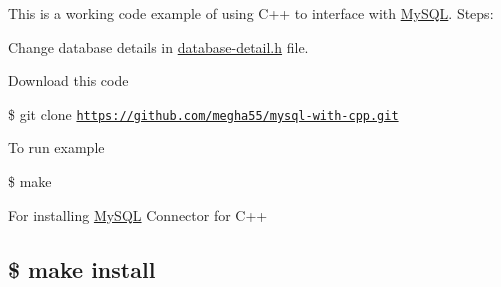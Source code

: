 



This is a working code example of using C++ to interface with \hyperlink{classMySQL}{My\-S\-Q\-L}. Steps\-:

\begin{DoxyItemize}
\item Change database details in \hyperlink{database-detail_8h}{database-\/detail.\-h} file.\end{DoxyItemize}
\begin{DoxyItemize}
\item Download this code \par
 \$ git clone \href{https://github.com/megha55/mysql-with-cpp.git}{\tt https\-://github.\-com/megha55/mysql-\/with-\/cpp.\-git}\end{DoxyItemize}
\begin{DoxyItemize}
\item To run example \par
 \$ make\end{DoxyItemize}
\begin{DoxyItemize}
\item For installing \hyperlink{classMySQL}{My\-S\-Q\-L} Connector for C++ \par
 \subsection*{\$ make install}\end{DoxyItemize}
